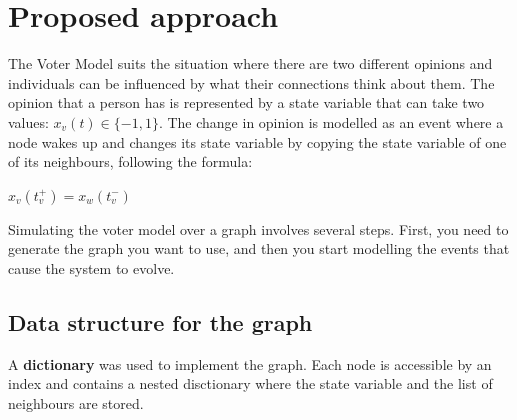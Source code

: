 \documentclass[conference]{IEEEtran}
\begin{document}

\section{Proposed approach}

    The Voter Model suits the situation where there are two different opinions and individuals can be influenced by what their connections think about them. 
    The opinion that a person has is represented by a state variable that can take two values: $ x_v(t) \in \{-1,1\}$.
    The change in opinion is modelled as an event where a node wakes up and changes its state variable by copying the state variable of one of its neighbours, following the formula:

    \begin{center}
        \begin{math}
            x_v(t_v^+) = x_w(t_v^-)
        \end{math}
    \end{center}

    Simulating the voter model over a graph involves several steps. 
    First, you need to generate the graph you want to use, and then you start modelling the events that cause the system to evolve.

    \subsection{Data structure for the graph}

        A \textbf{dictionary} was used to implement the graph. 
        Each node is accessible by an index and contains a nested disctionary where the state variable and the list of neighbours are stored. 
\end{document}
